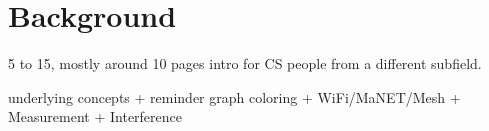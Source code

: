 \chapter{Background}

5 to 15, mostly around 10 pages
intro for CS people from a different subfield.

underlying concepts
+ reminder graph coloring
+ WiFi/MaNET/Mesh
+ Measurement
+ Interference 
